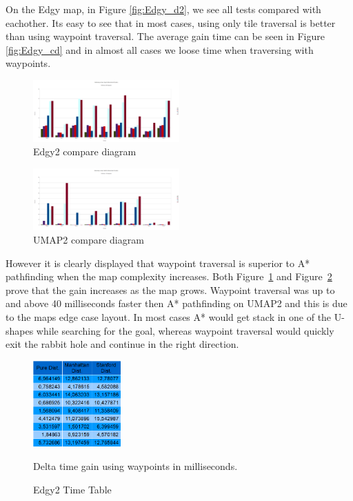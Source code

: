 \documentclass[a4paper]{article}
\begin{document}
On the Edgy map, in Figure \ref{fig:Edgy_d2}, we see all tests compared with eachother. Its easy to see that in most cases, using only tile traversal is better than using waypoint traversal.
The average gain time can be seen in Figure \ref{fig:Edgy_cd} and in almost all cases we loose time when traversing with waypoints.
	
\begin{figure}[h!]
\centering
\includegraphics[width=0.5\textwidth,height=\textheight,keepaspectratio]{ChartsAndFigures/Edgy2_d2.png}
\caption{Edgy2 compare diagram}
\label{fig:Edgy2_d2}
\end{figure}

\begin{figure}[h!]
\centering
\includegraphics[width=0.5\textwidth,height=\textheight,keepaspectratio]{ChartsAndFigures/UMAP2_d2.png}
\caption{UMAP2 compare diagram}
\label{fig:UMAP2_d2}
\end{figure}

However it is clearly displayed that waypoint traversal is superior to A* pathfinding when the map complexity increases. Both Figure~\ref{fig:Edgy2_d2} and Figure~\ref{fig:UMAP2_d2} prove that the gain increases as the map grows.
Waypoint traversal was up to and above 40 milliseconds faster then A* pathfinding on UMAP2 and this is due to the maps edge case layout. In most cases A* would get stack in one of the U-shapes while searching for the goal, whereas waypoint traversal would quickly exit the rabbit hole and continue in the right direction.

\begin{figure}[h!]
\centering
\includegraphics[width=0.3\textwidth,height=\textheight,keepaspectratio]{ChartsAndFigures/Edgy2_timeTable.png}
\caption{Edgy2 Time Table}
Delta time gain using waypoints in milliseconds.
\label{fig:Edgy2_cd}
\end{figure}
\end{document}
